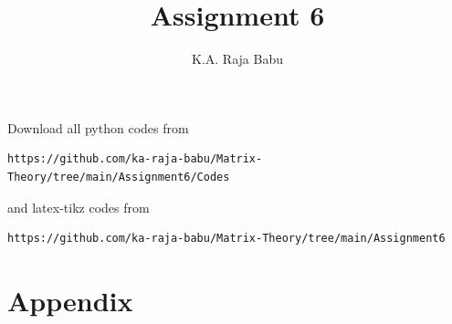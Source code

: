 \documentclass[journal,12pt,twocolumn]{IEEEtran}
\begin{document}
     \def\rightbox#1{\makebox[0in][r]{#1}}
     \def\centbox#1{\makebox[0in]{#1}}
     \def\topbox#1{\raisebox{-\baselineskip}[0in][0in]{#1}}
     \def\midbox#1{\raisebox{-0.5\baselineskip}[0in][0in]{#1}}
\vspace{3cm}
\title{Assignment 6}
\author{K.A. Raja Babu}
\maketitle
\newpage
\bigskip
\renewcommand{\thefigure}{\theenumi}
\renewcommand{\thetable}{\theenumi}
Download all python codes from 
\begin{lstlisting}
https://github.com/ka-raja-babu/Matrix-Theory/tree/main/Assignment6/Codes
\end{lstlisting}
%
and latex-tikz codes from 
%
\begin{lstlisting}
https://github.com/ka-raja-babu/Matrix-Theory/tree/main/Assignment6
\end{lstlisting}
%
\section{Appendix}
\end{document}
